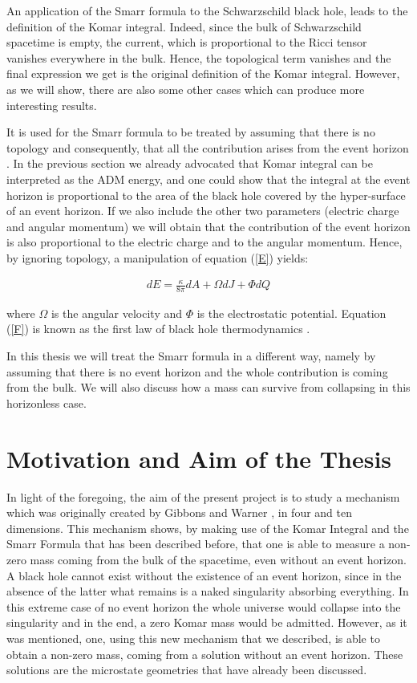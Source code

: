 \documentclass[a4paper,notitlepage]{report}
\begin{document}
An application of the Smarr formula to the Schwarzschild black hole, leads to the definition of the Komar integral. Indeed, since the bulk of Schwarzschild spacetime is empty, the current, which is proportional to the Ricci tensor vanishes everywhere in the bulk. Hence, the topological term vanishes and the final expression we get is the original definition of the Komar integral. However, as we will show, there are also some other cases which can produce more interesting results.

It is used for the Smarr formula to be treated by assuming that there is no topology and  consequently, that all the contribution arises from the event horizon \cite{ross2005black}. In the previous section we already advocated that Komar integral can be interpreted as the ADM energy, and one could show that the integral at the event horizon is proportional to the area of the black hole covered by the hyper-surface of an event horizon. If we also include the other two parameters (electric charge and angular momentum) we will obtain that the contribution of the event horizon is also proportional to the electric charge and to the angular momentum. Hence, by ignoring topology, a manipulation of equation (\ref{E}) yields:

\begin{align} \label{F}
dE = \frac{\kappa}{8\pi} dA + \Omega dJ + \Phi dQ
\end{align}

\vspace{0.5 em}
where $\Omega$ is the angular velocity and $\Phi$ is the electrostatic potential. Equation (\ref{F}) is known as the first law of black hole thermodynamics \cite{kodama2011lecture}.

In this thesis we will treat the Smarr formula in a different way, namely by assuming that there is no event horizon and the whole contribution is coming from the bulk. We will also discuss how a mass can survive from collapsing in this horizonless case.

\section{Motivation and Aim of the Thesis}

In light of the foregoing, the aim of the present project is to study a mechanism which was originally created by Gibbons and Warner \cite{gibbonsglobal}, in four and ten dimensions. This mechanism shows, by making use of the Komar Integral and the Smarr Formula that has been described before, that one is able to measure a non-zero mass coming from the bulk of the spacetime, even without an event horizon. A black hole cannot exist without the existence of an event horizon, since in the absence of the latter what remains is a naked singularity absorbing everything. In this extreme case of no event horizon the whole universe would collapse into the singularity and in the end, a zero Komar mass would be admitted. However, as it was mentioned, one, using this new mechanism that we described, is able to obtain a non-zero mass, coming from a solution without an event horizon. These solutions are the microstate geometries that have already been discussed.
\end{document}
